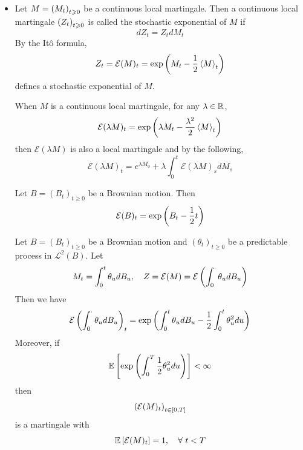 \documentclass[a4paper,12pt]{article}
\begin{document}
\begin{itemize}
  \item Let $M=\left(M_t\right)_{t \geqslant 0}$ be a continuous local martingale. Then a continuous local martingale $\left(Z_t\right)_{t \geqslant 0}$ is called the stochastic exponential of $M$ if
  \begin{equation*}
    dZ_t = Z_tdM_t
  \end{equation*}
  By the It\^o formula,
  \begin{equation*}
    Z_t = \mathcal{E}(M)_t = \exp\left(M_t - \frac{1}{2}\left\langle M \right\rangle_t\right)
  \end{equation*}
  defines a stochastic exponential of $M$.
  \begin{rmk}
    When $M$ is a continuous local martingale, for any $\lambda \in \mathbb{R}$,
    \begin{equation*}
      \mathcal{E}(\lambda M)_t = \exp\left(\lambda M_t - \frac{\lambda^2}{2}\left\langle M \right\rangle_t\right)
    \end{equation*}
    then $\mathcal{E}(\lambda M)$ is also a local martingale and by the following,
    \begin{equation*}
      \mathcal{E}(\lambda M)_t = e^{\lambda M_0} + \lambda \int_0^t \mathcal{E}(\lambda M)_s dM_s
    \end{equation*}
  \end{rmk}
  \begin{exam}
    Let $B=(B_t)_{t \geq 0}$ be a Brownian motion. Then
    \begin{equation*}
      \mathcal{E}(B)_t = \exp\left(B_t - \frac{1}{2}t\right)
    \end{equation*} 
  \end{exam}

  \begin{exam}
    Let $B=(B_t)_{t \geq 0}$ be a Brownian motion and $(\theta_t)_{t \geq 0}$ be a predictable process in $\mathcal{L}^2(B)$. Let
    \begin{equation*}
      M_t = \int_0^t \theta_u dB_u,\quad Z = \mathcal{E}(M) = \mathcal{E}\left(\int_0^{\cdot}\theta_u dB_u\right)
    \end{equation*}
    Then we have
    \begin{equation*}
      \mathcal{E}\left(\int_0^{\cdot}\theta_u dB_u\right)_t = \exp\left(\int_0^t\theta_u dB_u - \frac{1}{2}\int_0^t\theta_u^2du\right)
    \end{equation*}
    Moreover, if
    \begin{equation*}
      \mathbb{E}\left[\exp\left(\int_0^T\frac{1}{2} \theta_u^2du\right)\right] < \infty
    \end{equation*}
    then
    \begin{equation*}
      \left(\mathcal{E}(M)_t\right)_{t \in [0,T]}
    \end{equation*}
    is a martingale with
    \begin{equation*}
      \mathbb{E}\left[\mathcal{E}(M)_t\right] = 1,\quad \forall~t < T
    \end{equation*}
  \end{exam}


\end{itemize}
\end{document}
